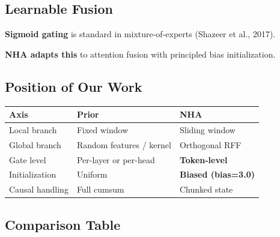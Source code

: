 \subsection{Learnable Fusion}

\textbf{Sigmoid gating} is standard in mixture-of-experts (Shazeer et al., 2017).

\textbf{NHA adapts this} to attention fusion with principled bias initialization.

\subsection{Position of Our Work}

\begin{table}[H]
\centering
\small
\begin{tabular}{lll}
\toprule
\textbf{Axis} & \textbf{Prior} & \textbf{NHA} \\
\midrule
Local branch & Fixed window & Sliding window \\
Global branch & Random features / kernel & Orthogonal RFF \\
Gate level & Per-layer or per-head & \textbf{Token-level} \\
Initialization & Uniform & \textbf{Biased (bias=3.0)} \\
Causal handling & Full cumsum & Chunked state \\
\bottomrule
\end{tabular}
\end{table}

\subsection{Comparison Table}

